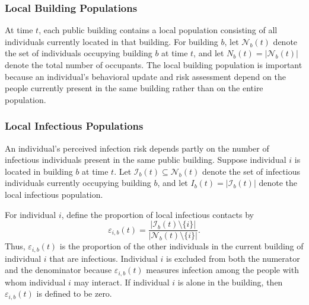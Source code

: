 \documentclass[11pt]{article}
\theoremstyle{definition}
\theoremstyle{plain}
\begin{document}


\subsubsection{Local Building Populations}

At time $t$, each public building contains a local population consisting of all individuals currently located in that building. For building $b$, let $\mathcal{N}_b(t)$ denote the set of individuals occupying building $b$ at time $t$, and let $N_b(t)=|\mathcal{N}_b(t)|$ denote the total number of occupants. The local building population is important because an individual's behavioral update and risk assessment depend on the people currently present in the same building rather than on the entire population.

\subsubsection{Local Infectious Populations}

An individual's perceived infection risk depends partly on the number of infectious individuals present in the same public building. Suppose individual $i$ is located in building $b$ at time $t$. Let $\mathcal{I}_b(t)\subseteq \mathcal{N}_b(t)$ denote the set of infectious individuals currently occupying building $b$, and let $I_b(t)=|\mathcal{I}_b(t)|$ denote the local infectious population.

For individual $i$, define the proportion of local infectious contacts by
\begin{equation}\label{eq:1}
 \varepsilon_{i,b}(t)=\frac{|\mathcal{I}_b(t)\setminus\{i\}|}{|\mathcal{N}_b(t)\setminus\{i\}|}.
\end{equation}
Thus, $\varepsilon_{i,b}(t)$ is the proportion of the other individuals in the current building of individual $i$ that are infectious. Individual $i$ is excluded from both the numerator and the denominator because $\varepsilon_{i,b}(t)$ measures infection among the people with whom individual $i$ may interact. If individual $i$ is alone in the building, then $\varepsilon_{i,b}(t)$ is defined to be zero.
\end{document}

